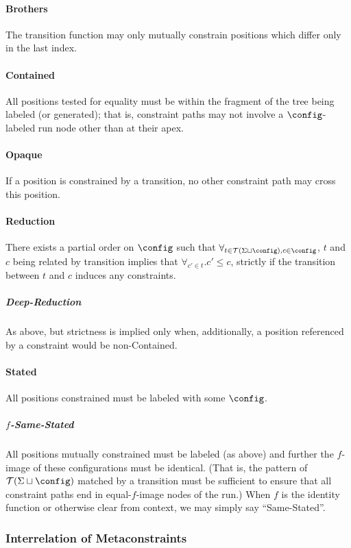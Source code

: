 \paragraph{Brothers} The transition function may only mutually constrain
positions which differ only in the last index.

\paragraph{Contained} All positions tested for equality must be within the
fragment of the tree being labeled (or generated); that is, constraint paths
may not involve a $\config$-labeled run node other than at their apex.

\paragraph{Opaque} If a position is constrained by a transition, no other
constraint path may cross this position. 

\paragraph{Reduction} There exists a partial order on $\config$ such that
$\forall_{t \in \mathcal{T}(\Sigma \sqcup \config), c \in \config}$, $t$ and
$c$ being related by transition implies that $\forall_{c' \in t} . c' \le
c$, strictly if the transition between $t$ and $c$ induces any constraints.

\subparagraph{Deep-Reduction} As above, but strictness is implied only when,
additionally, a position referenced by a constraint would be non-Contained.

\paragraph{Stated} All positions constrained must be labeled with some 
$\config$.

\subparagraph{$f$-Same-Stated} All positions mutually constrained must be
labeled (as above) and further the $f$-image of these configurations must be
identical.  (That is, the pattern of $\mathcal{T}(\Sigma \sqcup \config)$
matched by a transition must be sufficient to ensure that all constraint
paths end in equal-$f$-image nodes of the run.)  When $f$ is the identity
function or otherwise clear from context, we may simply say ``Same-Stated''.

\subsubsection{Interrelation of Metaconstraints}

